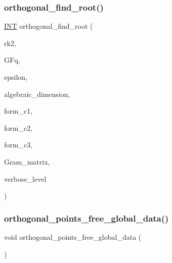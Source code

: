 \subsubsection{\texorpdfstring{orthogonal\+\_\+find\+\_\+root()}{orthogonal\_find\_root()}}
{\footnotesize\ttfamily \mbox{\hyperlink{galois_8h_a09fddde158a3a20bd2dcadb609de11dc}{I\+NT}} orthogonal\+\_\+find\+\_\+root (\begin{DoxyParamCaption}\item[{\mbox{\hyperlink{galois_8h_a09fddde158a3a20bd2dcadb609de11dc}{I\+NT}}}]{rk2,  }\item[{\mbox{\hyperlink{classfinite__field}{finite\+\_\+field}} \&}]{G\+Fq,  }\item[{\mbox{\hyperlink{galois_8h_a09fddde158a3a20bd2dcadb609de11dc}{I\+NT}}}]{epsilon,  }\item[{\mbox{\hyperlink{galois_8h_a09fddde158a3a20bd2dcadb609de11dc}{I\+NT}}}]{algebraic\+\_\+dimension,  }\item[{\mbox{\hyperlink{galois_8h_a09fddde158a3a20bd2dcadb609de11dc}{I\+NT}}}]{form\+\_\+c1,  }\item[{\mbox{\hyperlink{galois_8h_a09fddde158a3a20bd2dcadb609de11dc}{I\+NT}}}]{form\+\_\+c2,  }\item[{\mbox{\hyperlink{galois_8h_a09fddde158a3a20bd2dcadb609de11dc}{I\+NT}}}]{form\+\_\+c3,  }\item[{\mbox{\hyperlink{galois_8h_a09fddde158a3a20bd2dcadb609de11dc}{I\+NT}} $\ast$}]{Gram\+\_\+matrix,  }\item[{\mbox{\hyperlink{galois_8h_a09fddde158a3a20bd2dcadb609de11dc}{I\+NT}}}]{verbose\+\_\+level }\end{DoxyParamCaption})}

\mbox{\label{_l_i_b_2_g_a_l_o_i_s_2orthogonal__points_8_c_a9ff48c751a12182f1cc6ee384f80aa0b}} 
\subsubsection{\texorpdfstring{orthogonal\+\_\+points\+\_\+free\+\_\+global\+\_\+data()}{orthogonal\_points\_free\_global\_data()}}
{\footnotesize\ttfamily void orthogonal\+\_\+points\+\_\+free\+\_\+global\+\_\+data (\begin{DoxyParamCaption}{ }\end{DoxyParamCaption})}

